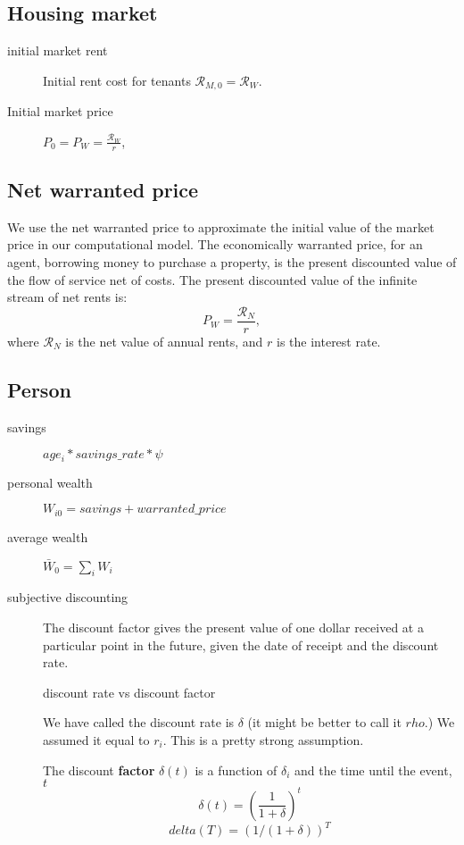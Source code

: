 \subsection{Housing market}
\begin{description}
\item [initial market rent] 
Initial rent cost for tenants  $\mathcal{R}_{M, 0}= \mathcal{R}_W$.

\item [Initial market price] 
$P_0= P_W=\frac{\mathcal{R}_W }{r}$,  
\end{description}


\subsection{Net warranted price} \label{section-warranted-price}
We use the net warranted price to approximate the initial value of the market price in our computational model. 
The economically \gls{warranted price}, for an agent, borrowing money to purchase a property, is the present discounted value of the flow of service net of costs. The present discounted value of the infinite stream of net rents is:
\begin{equation}
P_W=\frac{\mathcal{R}_N}{r},  
\label{eqn-price-warranted}
\end{equation}
where $\mathcal{R}_N$ is the net value of annual rents, and $r$ is the interest rate.  


\subsection{Person}
\begin{description}
\item[savings] $age_i*savings\_rate*\psi$
\item[personal wealth] $W_{i0}= savings + warranted\_price $
\item[average wealth] $\bar W_{0}= \sum_i W_i$
\item[subjective discounting] The discount factor gives the present value of one dollar received at a particular point in the future, given the date of receipt and the discount rate.

{discount rate vs discount factor}

We have called the  discount rate is $\delta$ (it might be better to call it $rho$.) We assumed it equal to $r_i$. This is a pretty strong assumption.

The discount \textbf{factor} $\delta(t)$ is a function of $\delta_i$ and the time until the event, $t$
\[\delta(t)=\left(\frac{1}{1+\delta}\right)^t\]
\[delta(T)=  (1/(1+\delta))^T\]   

\end{description}



